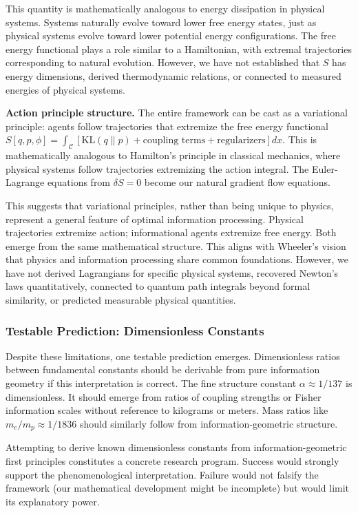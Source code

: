 \documentclass[11pt]{article}
\begin{document}
This quantity is mathematically analogous to energy dissipation in physical systems. Systems naturally evolve toward lower free energy states, just as physical systems evolve toward lower potential energy configurations. The free energy functional plays a role similar to a Hamiltonian, with extremal trajectories corresponding to natural evolution. However, we have not established that $S$ has energy dimensions, derived thermodynamic relations, or connected to measured energies of physical systems.

\textbf{Action principle structure.} The entire framework can be cast as a variational principle: agents follow trajectories that extremize the free energy functional $S[q,p,\phi] = \int_{\mathcal{C}} [\mathrm{KL}(q \| p) + \text{coupling terms} + \text{regularizers}] dx$. This is mathematically analogous to Hamilton's principle in classical mechanics, where physical systems follow trajectories extremizing the action integral. The Euler-Lagrange equations from $\delta S = 0$ become our natural gradient flow equations.

This suggests that variational principles, rather than being unique to physics, represent a general feature of optimal information processing. Physical trajectories extremize action; informational agents extremize free energy. Both emerge from the same mathematical structure. This aligns with Wheeler's vision that physics and information processing share common foundations. However, we have not derived Lagrangians for specific physical systems, recovered Newton's laws quantitatively, connected to quantum path integrals beyond formal similarity, or predicted measurable physical quantities.



\subsubsection{Testable Prediction: Dimensionless Constants}

Despite these limitations, one testable prediction emerges. Dimensionless ratios between fundamental constants should be derivable from pure information geometry if this interpretation is correct. The fine structure constant $\alpha \approx 1/137$ is dimensionless.  It should emerge from ratios of coupling strengths or Fisher information scales without reference to kilograms or meters. Mass ratios like $m_e/m_p \approx 1/1836$ should similarly follow from information-geometric structure.

Attempting to derive known dimensionless constants from information-geometric first principles constitutes a concrete research program. Success would strongly support the phenomenological interpretation. Failure would not falsify the framework (our mathematical development might be incomplete) but would limit its explanatory power.
\end{document}
